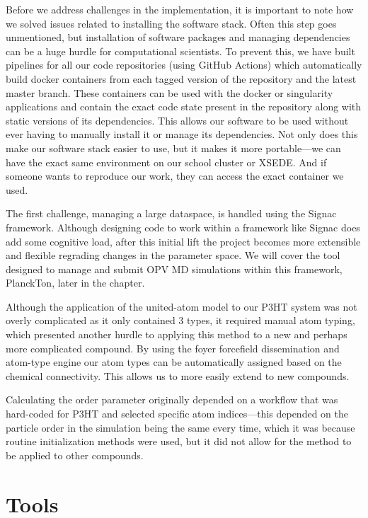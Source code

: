 Before we address challenges in the implementation, it is important to note how we solved issues related to installing the software stack.
Often this step goes unmentioned, but installation of software packages and managing dependencies can be a huge hurdle for computational scientists. 
To prevent this, we have built pipelines for all our code repositories (using GitHub Actions) which automatically build docker containers from each tagged version of the repository and the latest master branch. 
These containers can be used with the docker or singularity applications and contain the exact code state present in the repository along with static versions of its dependencies.
This allows our software to be used without ever having to manually install it or manage its dependencies. 
Not only does this make our software stack easier to use, but it makes it more portable---we can have the exact same environment on our school cluster or XSEDE.
And if someone wants to reproduce our work, they can access the exact container we used.

The first challenge, managing a large dataspace, is handled using the Signac framework. Although designing code to work within a framework like Signac does add some cognitive load, after this initial lift the project becomes more extensible and flexible regrading changes in the parameter space. We will cover the tool designed to manage and submit OPV MD simulations within this framework, PlanckTon, later in the chapter.

Although the application of the united-atom model to our P3HT system was not overly complicated as it only contained 3 types, it required manual atom typing, which presented another hurdle to applying this method to a new and perhaps more complicated compound. 
By using the foyer forcefield dissemination and atom-type engine \cite{foyer} our atom types can be automatically assigned based on the chemical connectivity. This allows us to more easily extend to new compounds.

Calculating the order parameter originally depended on a workflow that was hard-coded for P3HT and selected specific atom indices---this depended on the particle order in the simulation being the same every time, which it was because routine initialization methods were used, but it did not allow for the method to be applied to other compounds.

\section{Tools}


